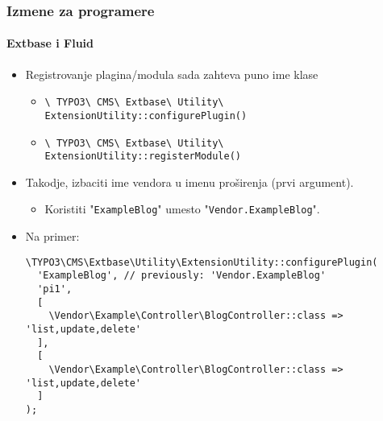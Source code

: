 
\begin{frame}[fragile]
	\frametitle{Izmene za programere}
	\framesubtitle{Extbase i Fluid}

	\lstset{basicstyle=\tiny\ttfamily}

	\begin{itemize}
		\item Registrovanje plagina/modula sada zahteva puno ime klase

			\begin{itemize}\smaller
				\item \texttt{\textbackslash
					TYPO3\textbackslash
					CMS\textbackslash
					Extbase\textbackslash
					Utility\textbackslash
					ExtensionUtility::configurePlugin()}
				\item \texttt{\textbackslash
					TYPO3\textbackslash
					CMS\textbackslash
					Extbase\textbackslash
					Utility\textbackslash
					ExtensionUtility::registerModule()}
			\end{itemize}\normalsize

		\item Takodje, izbaciti ime vendora u imenu proširenja (prvi argument).

			\begin{itemize}\smaller
				\item[\ding{228}] Koristiti "\texttt{ExampleBlog}" umesto "\texttt{Vendor.ExampleBlog}".
			\end{itemize}

		\item Na primer:

\begin{lstlisting}
\TYPO3\CMS\Extbase\Utility\ExtensionUtility::configurePlugin(
  'ExampleBlog', // previously: 'Vendor.ExampleBlog'
  'pi1',
  [
    \Vendor\Example\Controller\BlogController::class => 'list,update,delete'
  ],
  [
    \Vendor\Example\Controller\BlogController::class => 'list,update,delete'
  ]
);
\end{lstlisting}

	\end{itemize}

\end{frame}


